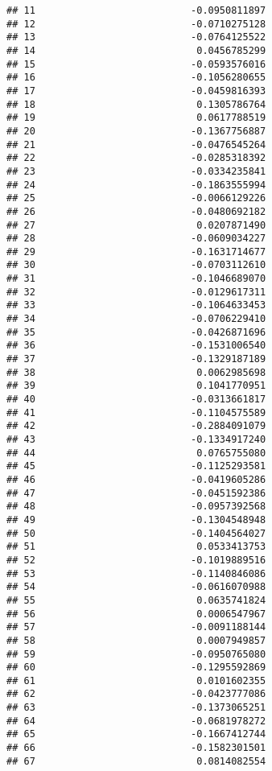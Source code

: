 \documentclass[
]{article}
\begin{document}
\begin{verbatim}
## 11                           -0.0950811897
## 12                           -0.0710275128
## 13                           -0.0764125522
## 14                            0.0456785299
## 15                           -0.0593576016
## 16                           -0.1056280655
## 17                           -0.0459816393
## 18                            0.1305786764
## 19                            0.0617788519
## 20                           -0.1367756887
## 21                           -0.0476545264
## 22                           -0.0285318392
## 23                           -0.0334235841
## 24                           -0.1863555994
## 25                           -0.0066129226
## 26                           -0.0480692182
## 27                            0.0207871490
## 28                           -0.0609034227
## 29                           -0.1631714677
## 30                           -0.0703112610
## 31                           -0.1046689070
## 32                           -0.0129617311
## 33                           -0.1064633453
## 34                           -0.0706229410
## 35                           -0.0426871696
## 36                           -0.1531006540
## 37                           -0.1329187189
## 38                            0.0062985698
## 39                            0.1041770951
## 40                           -0.0313661817
## 41                           -0.1104575589
## 42                           -0.2884091079
## 43                           -0.1334917240
## 44                            0.0765755080
## 45                           -0.1125293581
## 46                           -0.0419605286
## 47                           -0.0451592386
## 48                           -0.0957392568
## 49                           -0.1304548948
## 50                           -0.1404564027
## 51                            0.0533413753
## 52                           -0.1019889516
## 53                           -0.1140846086
## 54                           -0.0616070988
## 55                            0.0635741824
## 56                            0.0006547967
## 57                           -0.0091188144
## 58                            0.0007949857
## 59                           -0.0950765080
## 60                           -0.1295592869
## 61                            0.0101602355
## 62                           -0.0423777086
## 63                           -0.1373065251
## 64                           -0.0681978272
## 65                           -0.1667412744
## 66                           -0.1582301501
## 67                            0.0814082554

\end{verbatim}
\end{document}
